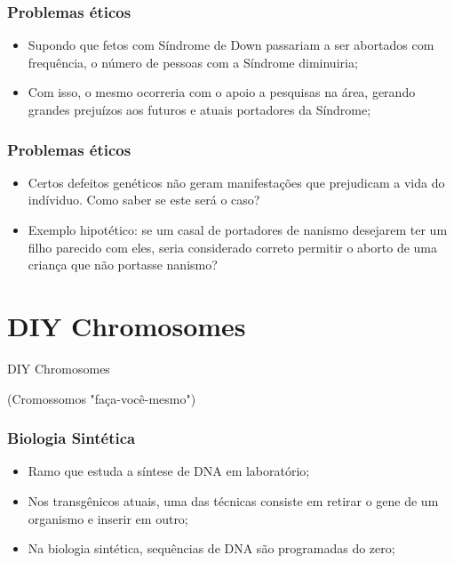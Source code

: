 \documentclass{beamer}
\begin{document}
\begin{frame}
\frametitle{Problemas éticos}
\begin{itemize}
\item Supondo que fetos com Síndrome de Down passariam a ser abortados com frequência, o número de pessoas com a Síndrome diminuiria; 
\item Com isso, o mesmo ocorreria com o apoio a pesquisas na área, gerando grandes prejuízos aos futuros e atuais portadores da Síndrome;
\end{itemize}
\end{frame}

\begin{frame}
\frametitle{Problemas éticos}
\begin{itemize}
\item Certos defeitos genéticos não geram manifestações que prejudicam a vida do indíviduo. Como saber se este será o caso?
\item Exemplo hipotético: se um casal de portadores de nanismo desejarem ter um filho parecido com eles, seria considerado correto permitir o aborto de uma criança que não portasse nanismo?
\end{itemize}
\end{frame}


\section{DIY Chromosomes}


\begin{frame}
\huge{\centerline{DIY Chromosomes}}
\normalsize{\centerline{(Cromossomos "faça-você-mesmo")}}
\end{frame}

\begin{frame}
\frametitle{Biologia Sintética}
\begin{itemize}
\item Ramo que estuda a síntese de DNA em laboratório;
\item Nos transgênicos atuais, uma das técnicas consiste em retirar o gene de um organismo e inserir em outro;
\item Na biologia sintética, sequências de DNA são programadas do zero;
\end{itemize}
\end{frame}
\end{document}
